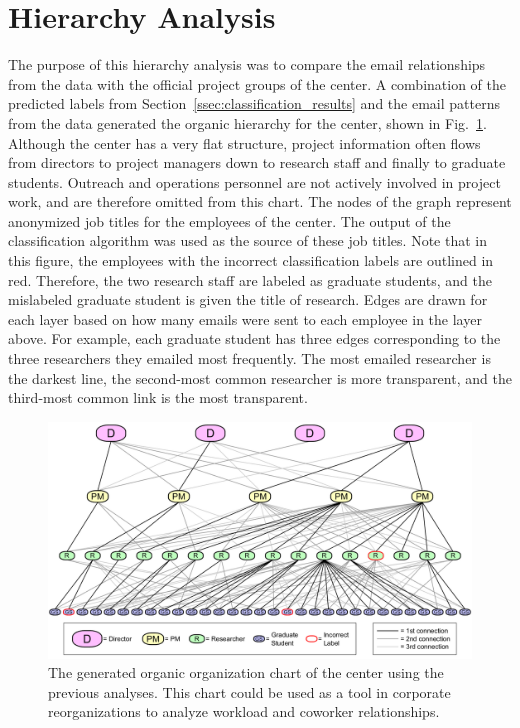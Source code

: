 \documentclass[12pt]{report}
\begin{document}
\section{Hierarchy Analysis}
The purpose of this hierarchy analysis was to compare the email relationships from the data with the official project groups of the center.
A combination of the predicted labels from Section~\ref{ssec:classification_results} and the email patterns from the data generated the organic hierarchy for the center, shown in Fig.~\ref{fig:generated_hierarchy}.
Although the center has a very flat structure, project information often flows from directors to project managers down to research staff and finally to graduate students.
Outreach and operations personnel are not actively involved in project work, and are therefore omitted from this chart.
The nodes of the graph represent anonymized job titles for the employees of the center.
The output of the classification algorithm was used as the source of these job titles.
Note that in this figure, the employees with the incorrect classification labels are outlined in red.
Therefore, the two research staff are labeled as graduate students, and the mislabeled graduate student is given the title of research.
Edges are drawn for each layer based on how many emails were sent to each employee in the layer above.
For example, each graduate student has three edges corresponding to the three researchers they emailed most frequently.
The most emailed researcher is the darkest line, the second-most common researcher is more transparent, and the third-most common link is the most transparent.

\begin{figure}[t]
	\centering
	\includegraphics[width=1.05\columnwidth,trim={0mm 0mm 0mm 0mm},clip]{org_chart_with_legend}
	\vspace{-7pt}
	\caption[Generated organic organization chart of the center]{The generated organic organization chart of the center using the previous analyses.  This chart could be used as a tool in corporate reorganizations to analyze workload and coworker relationships.}
	\label{fig:generated_hierarchy}
\end{figure}
\end{document}
